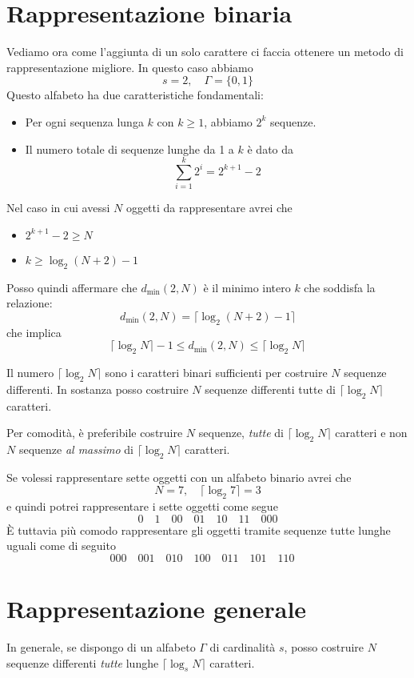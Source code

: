 \section{Rappresentazione binaria}
Vediamo ora come l'aggiunta di un solo carattere ci faccia ottenere un metodo di rappresentazione migliore. In questo caso
abbiamo
\[ s = 2, \quad \Gamma = \{ 0, 1 \} \]
Questo alfabeto ha due caratteristiche fondamentali:
\begin{itemize}
	\item Per ogni sequenza lunga $k$ con $k \geq 1$, abbiamo $2^k$ sequenze.
	\item Il numero totale di sequenze lunghe da 1 a $k$ \`e dato da
	      \[ \sum_{i = 1}^k 2^i = 2^{k + 1} - 2 \]
\end{itemize}
Nel caso in cui avessi $N$ oggetti da rappresentare avrei che
\begin{itemize}
	\item $2^{k + 1} - 2 \geq N$
	\item $k \geq \log_2 (N + 2) - 1$
\end{itemize}
Posso quindi affermare che $d_{\min}(2, N)$ \`e il minimo intero $k$ che soddisfa la relazione:
\[ d_{\min}(2, N) = \lceil \log_2 (N + 2) - 1 \rceil \]
che implica
\[ \lceil \log_2 N \rceil - 1 \leq d_{\min}(2, N) \leq \lceil \log_2 N \rceil \]

Il numero $\lceil \log_2 N \rceil$ sono i caratteri binari sufficienti per costruire $N$ sequenze differenti. In
sostanza posso costruire $N$ sequenze differenti tutte di $\lceil \log_2 N \rceil$ caratteri.

Per comodit\`a, \`e preferibile costruire $N$ sequenze, \emph{tutte} di $\lceil \log_2 N \rceil$ caratteri e non $N$
sequenze \emph{al massimo} di $\lceil \log_2 N \rceil$ caratteri.

\begin{example}
	Se volessi rappresentare sette oggetti con un alfabeto binario avrei che
	\[ N = 7, \quad \lceil \log_2 7 \rceil = 3 \]
	e quindi potrei rappresentare i sette oggetti come segue
	\[
		0 \quad
		1 \quad
		00 \quad
		01 \quad
		10 \quad
		11 \quad
		000
	\]
	\`E tuttavia pi\`u comodo rappresentare gli oggetti tramite sequenze tutte lunghe uguali come di seguito
	\[
		000 \quad
		001 \quad
		010 \quad
		100 \quad
		011 \quad
		101 \quad
		110 \quad
	\]
\end{example}

\section{Rappresentazione generale}
In generale, se dispongo di un alfabeto $\Gamma$ di cardinalit\`a $s$, posso costruire $N$ sequenze differenti \emph{tutte}
lunghe $\lceil \log_s N \rceil$ caratteri.

